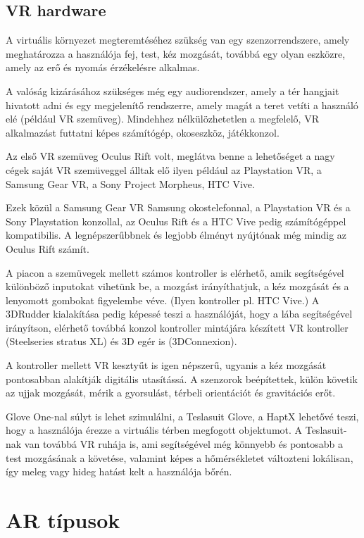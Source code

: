 \documentclass[a4paper,12pt]{article}
\begin{document}
\subsection{VR hardware}

A virtuális környezet megteremtéséhez szükség van egy szenzorrendszere, amely meghatározza a használója fej, test, kéz mozgását, továbbá egy olyan eszközre, amely az erő és nyomás érzékelésre alkalmas.

A valóság kizárásához szükséges még egy audiorendszer, amely a tér hangjait hivatott adni és egy megjelenítő rendszerre, amely magát a teret vetíti a használó elé (például VR szemüveg).
Mindehhez nélkülözhetetlen a megfelelő, VR alkalmazást futtatni képes számítógép, okoseszköz, játékkonzol. 

Az első VR szemüveg Oculus Rift volt, meglátva benne a lehetőséget a nagy cégek saját VR szemüveggel álltak elő ilyen például az Playstation VR, a Samsung Gear VR, a Sony Project Morpheus, HTC Vive.

Ezek közül a Samsung Gear VR Samsung okostelefonnal, a Playstation VR és a Sony Playstation konzollal, az Oculus Rift és a HTC Vive pedig számítógéppel kompatibilis. A legnépszerűbbnek és legjobb élményt nyújtónak még mindig az Oculus Rift számít.

A piacon a szemüvegek mellett számos kontroller is elérhető, amik segítségével különböző inputokat vihetünk be, a mozgást irányíthatjuk, a kéz mozgását és a lenyomott gombokat figyelembe véve. (Ilyen kontroller pl. HTC Vive.) A 3DRudder kialakítása pedig képessé teszi a használóját, hogy a lába segítségével irányítson, elérhető továbbá konzol kontroller mintájára készített VR kontroller (Steelseries stratus XL) és 3D egér is (3DConnexion).

A kontroller mellett VR kesztyűt is igen népszerű, ugyanis a kéz mozgását pontosabban alakítják digitális utasítássá.  A szenzorok beépítettek, külön követik az ujjak mozgását, mérik a gyorsulást, térbeli orientációt és gravitációs erőt.

Glove One-nal súlyt is lehet szimulálni, a Teslasuit Glove, a HaptX lehetővé teszi, hogy a használója érezze a virtuális térben megfogott objektumot. 
A Teslasuit-nak van továbbá VR ruhája is, ami segítségével még könnyebb és pontosabb a test mozgásának a követése, valamint képes a hőmérsékletet változteni lokálisan, így meleg vagy hideg hatást kelt a használója bőrén.

\section{AR típusok}
\end{document}
